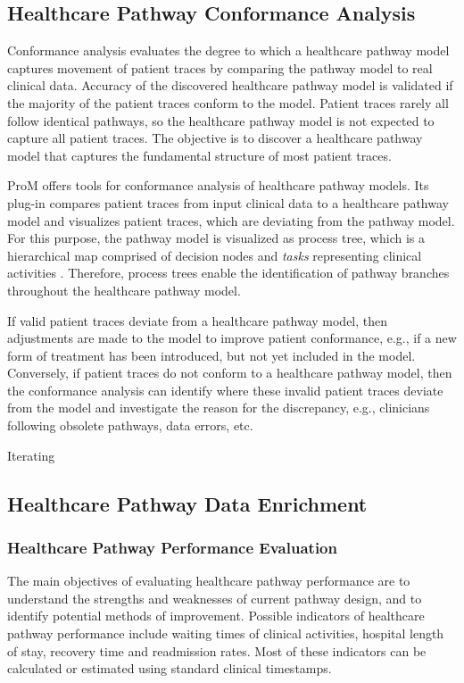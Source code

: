 \subsection{Healthcare Pathway Conformance Analysis}
Conformance analysis evaluates the degree to which a healthcare pathway model captures movement of patient traces by comparing the pathway model to real clinical data. 
Accuracy of the discovered healthcare pathway model is validated if the majority of the patient traces conform to the model. Patient traces rarely all follow identical pathways, so the healthcare pathway model is not expected to capture all patient traces. The objective is to discover a healthcare pathway model that captures the fundamental structure of most patient traces. 

ProM offers tools for conformance analysis of healthcare
pathway models. Its plug-in  compares
patient traces from input clinical data to a healthcare pathway model
and visualizes patient traces, which are deviating from the pathway
model.
For this purpose, the pathway model is visualized as process tree,
which is a hierarchical map comprised of decision nodes and
\textit{tasks} representing clinical activities
\cite{25a7fd818bf44606a903d9b78b95cdd3}.
Therefore, process trees enable the identification of pathway branches
throughout the healthcare pathway model.

If valid patient traces deviate from a healthcare pathway model, then
adjustments are made to the model to improve patient conformance,
e.g., if a new form of treatment has been introduced, but not yet
included in the model.
Conversely, if patient traces do not conform to a healthcare pathway model, then the conformance analysis can identify where these invalid patient traces deviate from the model and investigate the reason for the discrepancy, e.g., clinicians following obsolete pathways, data errors, etc.

Iterating 





\subsection{Healthcare Pathway Data Enrichment}
\subsubsection{Healthcare Pathway Performance Evaluation}
The main objectives of evaluating healthcare pathway performance are to understand the strengths and weaknesses of current pathway design, and to identify potential methods of improvement. Possible indicators of healthcare pathway performance include waiting times of clinical activities, hospital length of stay, recovery time and readmission rates. Most of these indicators can be calculated or estimated using standard clinical timestamps.

